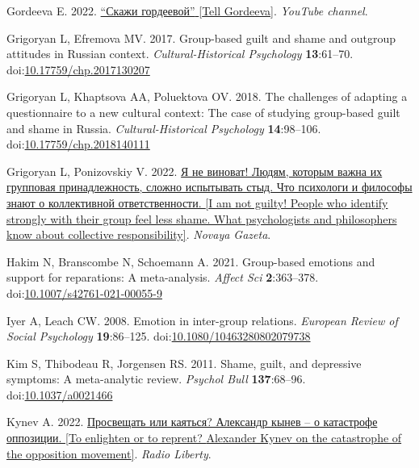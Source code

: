 \documentclass[
]{article}
\newlength{\cslhangindent}
\newlength{\cslentryspacingunit} %
\newenvironment{CSLReferences}[2] %
 {%
  \setlength{\parindent}{0pt}
  \ifodd #1
  \let\oldpar\par
  \def\par{\hangindent=\cslhangindent\oldpar}
  \fi
  \setlength{\parskip}{#2\cslentryspacingunit}
 }%
 {}
\begin{document}
\begin{CSLReferences}{1}{0}
\leavevmode{}%
Gordeeva E. 2022. \href{https://www.youtube.com/@skazhigordeevoy}{{``Скажи гордеевой''} {{[}Tell Gordeeva{]}}}. \emph{YouTube channel}.

\leavevmode{}%
Grigoryan L, Efremova MV. 2017. Group-based guilt and shame and outgroup attitudes in {Russian} context. \emph{Cultural-Historical Psychology} \textbf{13}:61--70. doi:\href{https://doi.org/10.17759/chp.2017130207}{10.17759/chp.2017130207}

\leavevmode{}%
Grigoryan L, Khaptsova AA, Poluektova OV. 2018. The challenges of adapting a questionnaire to a new cultural context: The case of studying group-based guilt and shame in {Russia}. \emph{Cultural-Historical Psychology} \textbf{14}:98--106. doi:\href{https://doi.org/10.17759/chp.2018140111}{10.17759/chp.2018140111}

\leavevmode{}%
Grigoryan L, Ponizovskiy V. 2022. \href{https://novaya.media/articles/2022/08/16/ia-ne-vinovat}{Я не виноват! Людям, которым важна их групповая принадлежность, сложно испытывать стыд. Что психологи и философы знают о коллективной ответственности. {[}I am not guilty! People who identify strongly with their group feel less shame. What psychologists and philosophers know about collective responsibility{]}}. \emph{Novaya Gazeta}.

\leavevmode{}%
Hakim N, Branscombe N, Schoemann A. 2021. Group-based emotions and support for reparations: A meta-analysis. \emph{Affect Sci} \textbf{2}:363--378. doi:\href{https://doi.org/10.1007/s42761-021-00055-9}{10.1007/s42761-021-00055-9}

\leavevmode{}%
Iyer A, Leach CW. 2008. Emotion in inter-group relations. \emph{European Review of Social Psychology} \textbf{19}:86--125. doi:\href{https://doi.org/10.1080/10463280802079738}{10.1080/10463280802079738}

\leavevmode{}%
Kim S, Thibodeau R, Jorgensen RS. 2011. Shame, guilt, and depressive symptoms: A meta-analytic review. \emph{Psychol Bull} \textbf{137}:68--96. doi:\href{https://doi.org/10.1037/a0021466}{10.1037/a0021466}

\leavevmode{}%
Kynev A. 2022. \href{https://www.svoboda.org/a/prosveschatj-ili-kayatjsya-aleksandr-kynev-o-katastrofe-oppozitsii/31792631.html}{Просвещать или каяться? Александр кынев -- о катастрофе оппозиции. {[}To enlighten or to reprent? {Alexander Kynev} on the catastrophe of the opposition movement{]}}. \emph{Radio Liberty}.


\end{CSLReferences}
\end{document}
